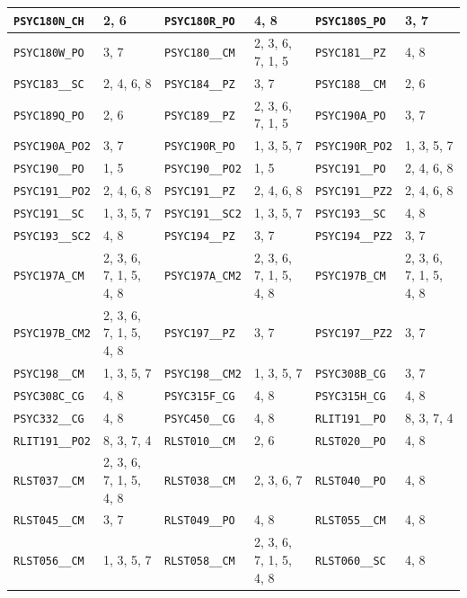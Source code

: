 \begin{longtable}{|l|l||l|l||l|l|}
    \verb|PSYC180N_CH| & 2, 6 & \verb|PSYC180R_PO| & 4, 8 & \verb|PSYC180S_PO| & 3, 7\\\hline
    \verb|PSYC180W_PO| & 3, 7 & \verb|PSYC180__CM| & 2, 3, 6, 7, 1, 5 & \verb|PSYC181__PZ| & 4, 8\\\hline
    \verb|PSYC183__SC| & 2, 4, 6, 8 & \verb|PSYC184__PZ| & 3, 7 & \verb|PSYC188__CM| & 2, 6\\\hline
    \verb|PSYC189Q_PO| & 2, 6 & \verb|PSYC189__PZ| & 2, 3, 6, 7, 1, 5 & \verb|PSYC190A_PO| & 3, 7\\\hline
    \verb|PSYC190A_PO2| & 3, 7 & \verb|PSYC190R_PO| & 1, 3, 5, 7 & \verb|PSYC190R_PO2| & 1, 3, 5, 7\\\hline
    \verb|PSYC190__PO| & 1, 5 & \verb|PSYC190__PO2| & 1, 5 & \verb|PSYC191__PO| & 2, 4, 6, 8\\\hline
    \verb|PSYC191__PO2| & 2, 4, 6, 8 & \verb|PSYC191__PZ| & 2, 4, 6, 8 & \verb|PSYC191__PZ2| & 2, 4, 6, 8\\\hline
    \verb|PSYC191__SC| & 1, 3, 5, 7 & \verb|PSYC191__SC2| & 1, 3, 5, 7 & \verb|PSYC193__SC| & 4, 8\\\hline
    \verb|PSYC193__SC2| & 4, 8 & \verb|PSYC194__PZ| & 3, 7 & \verb|PSYC194__PZ2| & 3, 7\\\hline
    \verb|PSYC197A_CM| & 2, 3, 6, 7, 1, 5, 4, 8 & \verb|PSYC197A_CM2| & 2, 3, 6, 7, 1, 5, 4, 8 & \verb|PSYC197B_CM| & 2, 3, 6, 7, 1, 5, 4, 8\\\hline
    \verb|PSYC197B_CM2| & 2, 3, 6, 7, 1, 5, 4, 8 & \verb|PSYC197__PZ| & 3, 7 & \verb|PSYC197__PZ2| & 3, 7\\\hline
    \verb|PSYC198__CM| & 1, 3, 5, 7 & \verb|PSYC198__CM2| & 1, 3, 5, 7 & \verb|PSYC308B_CG| & 3, 7\\\hline
    \verb|PSYC308C_CG| & 4, 8 & \verb|PSYC315F_CG| & 4, 8 & \verb|PSYC315H_CG| & 4, 8\\\hline
    \verb|PSYC332__CG| & 4, 8 & \verb|PSYC450__CG| & 4, 8 & \verb|RLIT191__PO| & 8, 3, 7, 4\\\hline
    \verb|RLIT191__PO2| & 8, 3, 7, 4 & \verb|RLST010__CM| & 2, 6 & \verb|RLST020__PO| & 4, 8\\\hline
    \verb|RLST037__CM| & 2, 3, 6, 7, 1, 5, 4, 8 & \verb|RLST038__CM| & 2, 3, 6, 7 & \verb|RLST040__PO| & 4, 8\\\hline
    \verb|RLST045__CM| & 3, 7 & \verb|RLST049__PO| & 4, 8 & \verb|RLST055__CM| & 4, 8\\\hline
    \verb|RLST056__CM| & 1, 3, 5, 7 & \verb|RLST058__CM| & 2, 3, 6, 7, 1, 5, 4, 8 & \verb|RLST060__SC| & 4, 8\\\hline

\end{longtable}
